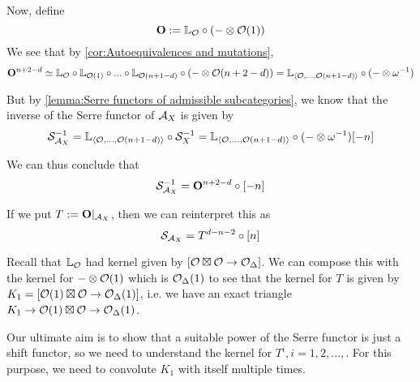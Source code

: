 Now, define $$\mathbf{O}:=\mathbb{L}_{\mathcal{O}} \circ (-\otimes \mathcal{O}(1))$$
We see that by \ref{cor:Autoequivalences and mutations}, $$\mathbf{O}^{n+2-d}\simeq \mathbb{L}_{\mathcal{O}} \circ \mathbb{L}_{\mathcal{O}(1)}\circ ... \circ \mathbb{L}_{\mathcal{O}(n+1-d)}\circ (-\otimes \mathcal{O}(n+2-d))=\mathbb{L}_{\langle \mathcal{O}, \dots, \mathcal{O}(n+1-d) \rangle} \circ (-\otimes \omega ^{-1})$$

But by \ref{lemma:Serre functors of admissible subcategories}, we know that the inverse of the Serre functor of $\mathcal{A}_X$ is given by $$\mathcal{S}_{\mathcal{A}_X}^{-1} =  \mathbb{L}_{\langle \mathcal{O}, \dots, \mathcal{O}(n+1-d) \rangle} \circ \mathcal{S}_X ^{-1}=\mathbb{L}_{\langle \mathcal{O}, \dots, \mathcal{O}(n+1-d) \rangle} \circ (-\otimes \omega^{-1})[-n]$$

We can thus conclude that $$\mathcal{S}_{\mathcal{A}_X}^{-1} = \mathbf{O}^{n+2-d}\circ [-n]$$

If we put $T:=\mathbf{O}|_{\mathcal{A}_X}$, then we can reinterpret this as $$\mathcal{S}_{\mathcal{A}_X}=T^{d-n-2}\circ [n]$$

Recall that $\mathbb{L}_{\mathcal{O}}$ had kernel given by $[\mathcal{O} \boxtimes \mathcal{O} \rightarrow \mathcal{O}_\Delta]$. We can compose this with the kernel for $-\otimes \mathcal{O}(1)$ which is $\mathcal{O}_\Delta(1)$ to see that the kernel for $T$ is given by $K_1=[\mathcal{O}(1)\boxtimes \mathcal{O} \rightarrow \mathcal{O}_\Delta(1)]$, i.e. we have an exact triangle $K_1 \rightarrow  \mathcal{O}(1)\boxtimes \mathcal{O} \rightarrow \mathcal{O}_\Delta(1)$. 

Our ultimate aim is to show that a suitable power of the Serre functor is just a shift functor, so we need to understand the kernel for $T^i, i=1,2,\dots, $. For this purpose, we need to convolute $K_1$ with itself multiple times. 

